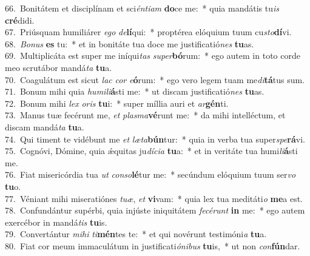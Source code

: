 {66.~}Bonitátem et disciplínam et sci\textit{én}\textit{ti}\textit{am} \textbf{do}ce me:~* quia mandátis tu\textit{is} \textbf{cré}didi.\\
{67.~}Priúsquam humiliárer \textit{e}\textit{go} \textit{de}\textbf{lí}qui:~* proptérea elóquium tuum cu\textit{sto}\textbf{dí}vi.\\
{68.~}\textit{Bo}\textit{nus} \textbf{es} tu:~* et in bonitáte tua doce me justificatió\textit{nes} \textbf{tu}as.\\
{69.~}Multiplicáta est super me iníqui\textit{tas} \textit{su}\textit{per}\textbf{bó}rum:~* ego autem in toto corde meo scrutábor mandá\textit{ta} \textbf{tu}a.\\
{70.~}Coagulátum est sicut \textit{lac} \textit{cor} \textit{e}\textbf{ó}rum:~* ego vero legem tuam me\textit{di}\textbf{tá}tus sum.\\
{71.~}Bonum mihi quia \textit{hu}\textit{mi}\textit{li}\textbf{á}sti me:~* ut discam justificatió\textit{nes} \textbf{tu}as.\\
{72.~}Bonum mihi \textit{lex} \textit{o}\textit{ris} \textbf{tu}i:~* super míllia auri et \textit{ar}\textbf{gén}ti.\\
{73.~}Manus tuæ fecérunt me, \textit{et} \textit{plas}\textit{ma}\textbf{vé}runt me:~* da mihi intelléctum, et discam mandá\textit{ta} \textbf{tu}a.\\
{74.~}Qui timent te vidébunt me \textit{et} \textit{læ}\textit{ta}\textbf{bún}tur:~* quia in verba tua super\textit{spe}\textbf{rá}vi.\\
{75.~}Cognóvi, Dómine, quia ǽquitas ju\textit{dí}\textit{ci}\textit{a} \textbf{tu}a:~* et in veritáte tua humi\textit{li}\textbf{á}sti me.\\
{76.~}Fiat misericórdia tua \textit{ut} \textit{con}\textit{so}\textbf{lé}tur me:~* secúndum elóquium tuum ser\textit{vo} \textbf{tu}o.\\
{77.~}Véniant mihi miseratiónes \textit{tu}\textit{æ}, \textit{et} \textbf{vi}vam:~* quia lex tua meditáti\textit{o} \textbf{me}a est.\\
{78.~}Confundántur supérbi, quia injúste iniquitátem \textit{fe}\textit{cé}\textit{runt} \textbf{in} me:~* ego autem exercébor in mandá\textit{tis} \textbf{tu}is.\\
{79.~}Convertántur \textit{mi}\textit{hi} \textit{ti}\textbf{mén}tes te:~* et qui novérunt testimóni\textit{a} \textbf{tu}a.\\
{80.~}Fiat cor meum immaculátum in justificati\textit{ó}\textit{ni}\textit{bus} \textbf{tu}is,~* ut non \textit{con}\textbf{fún}dar.\\
